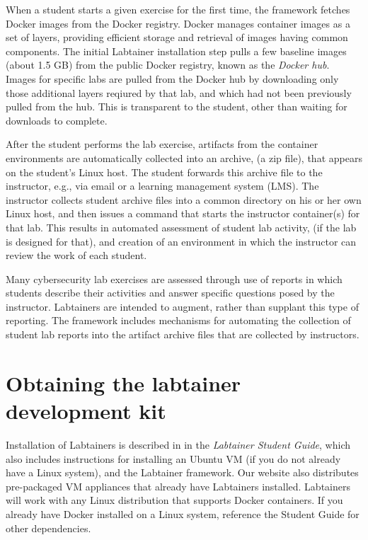 \documentclass[12pt]{article}
\begin{document}
When a student starts a given exercise for the first time, the framework fetches
Docker images from the Docker registry.  Docker manages container images as a set of
layers, providing efficient storage and retrieval of images having common components.
The initial Labtainer installation step pulls a few baseline images (about 1.5 GB) from 
the public
Docker registry, known as the \textit{Docker hub}.  Images for specific labs are pulled
from the Docker hub by downloading only those additional layers reqiured by that lab, and
which had not been previously pulled from the hub.  This is transparent to
the student, other than waiting for downloads to complete.

After the student performs the lab exercise, artifacts from the container
environments are automatically collected into an archive, (a zip file), that appears on
the student's Linux host.  The student forwards this archive file to the instructor,
e.g., via email or a learning management system (LMS).  The instructor collects student archive files into a common
directory on his or her own Linux host, and then issues a command that starts
the instructor container(s) for that lab.  This results in automated assessment of student lab
activity, (if the lab is designed for that), and creation of an environment
in which the instructor can review the work of each student.

Many cybersecurity lab exercises are assessed through use of reports in which students
describe their activities and answer specific questions posed by the instructor.  Labtainers
are intended to augment, rather than supplant this type of reporting.  The framework includes
mechanisms for automating the collection of student lab reports into the artifact archive files
that are collected by instructors. 

\section {Obtaining the labtainer development kit}
Installation of Labtainers is described in in the \textit{Labtainer Student Guide},  
which also includes instructions for installing an Ubuntu VM (if you do not already have a Linux system),
and the Labtainer framework.  Our website also distributes pre-packaged VM appliances that already have
Labtainers installed. Labtainers will work with any Linux
distribution that supports Docker containers.  If you already have Docker installed on a Linux system, 
reference the Student Guide for other dependencies. 
\end{document}
